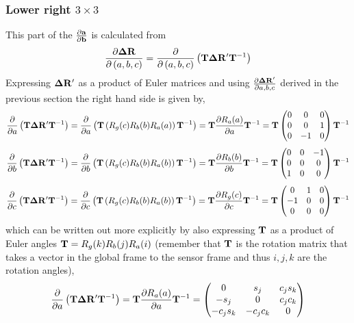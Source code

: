 \documentclass{article}
\def\vec#1{\ensuremath{\mathrm{\bf #1}}}
\def\partder#1#2{\ensuremath{\frac{\partial #1}{\partial #2}}}
\begin{document}
\subsubsection*{Lower right $3\times3$}
This part of the \partder{\vec{a}}{\vec{b}} is calculated from \label{eq:drdr}
\[
\partder{\vec{\Delta R}}{\left(a,b,c\right)} =  \partder{}{\left(a,b,c\right)} \left (  \vec{T} \vec{\Delta R'} \vec{T}^{-1} \right )
\]
Expressing $\vec{\Delta R'}$ as a product of Euler matrices and using $\partder{\vec{\Delta R}'}{a,b,c}$ derived in the previous section the right hand side is given by, 
\[
 \partder{}{a} \left( \vec{T} \vec{\Delta R'}  \vec{T}^{-1}  \right) =  \partder{}{a} \left ( \vec{T} \left( R_g( c)  R_b(b) R_a(a)    \right) \vec{T}^{-1} \right ) = \vec{T} \partder{R_a(a)}{a} \vec{T}^{-1} = \vec{T} 
 \begin{pmatrix}
 0 & 0 & 0 \\
 0 & 0 & 1 \\
 0 & -1 & 0  
 \end{pmatrix}
 \vec{T}^{-1} 
\]
\[
 \partder{}{b} \left( \vec{T} \vec{\Delta R'}  \vec{T}^{-1} \right) =  \partder{}{b} \left ( \vec{T} \left( R_g( c)  R_b(b) R_a(b)    \right) \vec{T}^{-1} \right ) = \vec{T} \partder{R_b(b)}{b} \vec{T}^{-1} = \vec{T} 
 \begin{pmatrix}
 0 & 0 & -1 \\
 0 & 0 & 0 \\
 1 & 0 & 0  
 \end{pmatrix}
 \vec{T}^{-1} \\
\]
\[
 \partder{}{c} \left( \vec{T} \vec{\Delta R'} \vec{T}^{-1}  \right) =  \partder{}{c} \left ( \vec{T} \left( R_g( c)  R_b(b) R_a(b)    \right) \vec{T}^{-1} \right ) = \vec{T} \partder{R_g( c)}{c} \vec{T}^{-1} = \vec{T} 
 \begin{pmatrix}
 0 & 1 & 0 \\
 -1 & 0 & 0 \\
 0 & 0 & 0  
 \end{pmatrix}
 \vec{T}^{-1} \\
\]
which can be written out more explicitly by also expressing $\vec{T}$ as a product of Euler angles 
$\vec{T} = R_g(k) R_b(j) R_a(i)$ (remember that $\vec{T}$ is the rotation matrix that takes a vector in the global frame to the sensor frame and thus $i,j,k$ are the rotation angles),
\[
 \partder{}{a} \left( \vec{T} \vec{\Delta R'} \vec{T}^{-1}   \right) = \vec{T} \partder{R_a(a)}{a} \vec{T}^{-1} =
\begin{pmatrix}
0 & s_j & c_j s_k \\ 
-s_j& 0& c_j c_k \\
-c_j s_k & -c_j c_k & 0
\end{pmatrix}
\]
\end{document}
